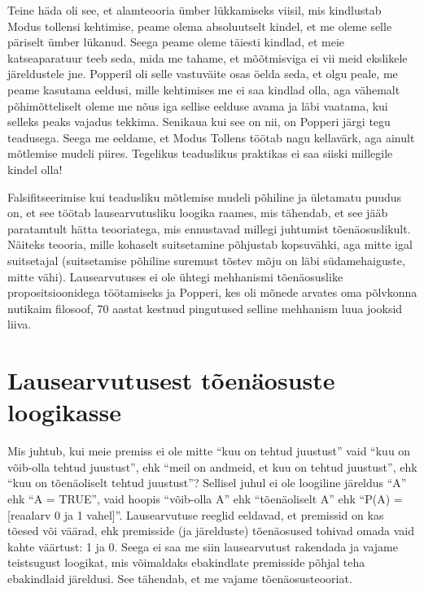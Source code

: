\documentclass[]{book}
\begin{document}
Teine häda oli see, et alamteooria ümber lükkamiseks viisil, mis kindlustab Modus tollensi kehtimise, peame olema absoluutselt kindel, et me oleme selle päriselt ümber lükanud. Seega peame oleme täiesti kindlad, et meie katseaparatuur teeb seda, mida me tahame, et mõõtmisviga ei vii meid ekslikele järeldustele jne. Popperil oli selle vastuväite osas öelda seda, et olgu peale, me peame kasutama eeldusi, mille kehtimises me ei saa kindlad olla, aga vähemalt põhimõtteliselt oleme me nõus iga sellise eelduse avama ja läbi vaatama, kui selleks peaks vajadus tekkima. Senikaua kui see on nii, on Popperi järgi tegu teadusega. Seega me eeldame, et Modus Tollens töötab nagu kellavärk, aga ainult mõtlemise mudeli piires. Tegelikus teaduslikus praktikas ei saa siiski millegile kindel olla!

Falsifitseerimise kui teadusliku mõtlemise mudeli põhiline ja ületamatu puudus on, et see töötab lausearvutusliku loogika raames, mis tähendab, et see jääb paratamtult hätta teooriatega, mis ennustavad millegi juhtumist tõenäosuslikult. Näiteks teooria, mille kohaselt suitsetamine põhjustab kopsuvähki, aga mitte igal suitsetajal (suitsetamise põhiline suremust tõstev mõju on läbi südamehaiguste, mitte vähi). Lausearvutuses ei ole ühtegi mehhanismi tõenäosuslike propositsioonidega töötamiseks ja Popperi, kes oli mõnede arvates oma põlvkonna nutikaim filosoof, 70 aastat kestnud pingutused selline mehhanism luua jooksid liiva.

\hypertarget{lausearvutusest-toenaosuste-loogikasse}{%
\section{Lausearvutusest tõenäosuste loogikasse}\label{lausearvutusest-toenaosuste-loogikasse}}

Mis juhtub, kui meie premiss ei ole mitte ``kuu on tehtud juustust'' vaid ``kuu on võib-olla tehtud juustust'', ehk ``meil on andmeid, et kuu on tehtud juustust'', ehk ``kuu on tõenäoliselt tehtud juustust''?
Sellisel juhul ei ole loogiline järeldus ``A'' ehk ``A = TRUE'', vaid hoopis ``võib-olla A'' ehk ``tõenäoliselt A'' ehk ``P(A) = {[}reaalarv 0 ja 1 vahel{]}''.
Lausearvutuse reeglid eeldavad, et premissid on kas tõesed või väärad, ehk premisside (ja järelduste) tõenäosused tohivad omada vaid kahte väärtust: 1 ja 0.
Seega ei saa me siin lausearvutust rakendada ja vajame teistsugust loogikat, mis võimaldaks ebakindlate premisside põhjal teha ebakindlaid järeldusi. See tähendab, et me vajame tõenäosusteooriat.
\end{document}
